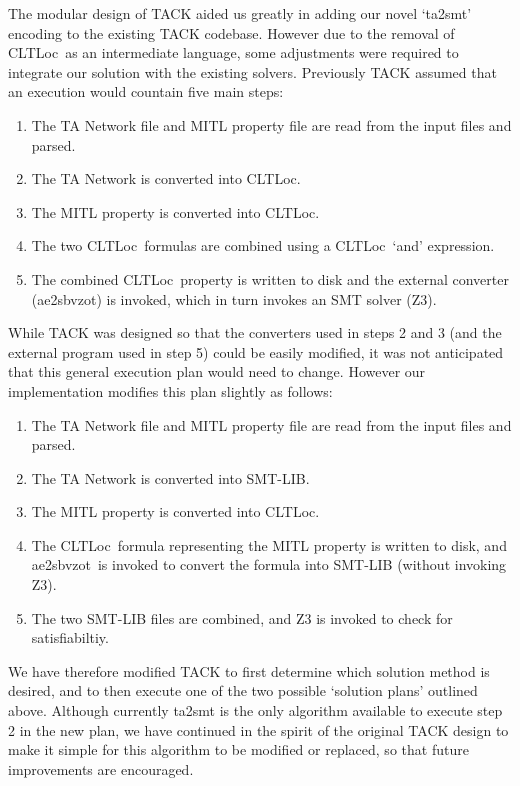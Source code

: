\documentclass[a4paper,11pt]{report}
\theoremstyle{definition}
\newcommand{\cltloc}{CLTLoc}
\newcommand{\aez}{ae2sbvzot}
\begin{document}
The modular design of TACK aided us greatly in adding our novel `ta2smt'
encoding to the existing TACK codebase. However due to the removal of \cltloc\
as an intermediate language, some adjustments were required to integrate our
solution with the existing solvers. Previously TACK assumed that an execution
would countain five main steps:
\begin{enumerate}
  \item The TA Network file and MITL property file are read from the input
  files and parsed.
  \item The TA Network is converted into \cltloc.
  \item The MITL property is converted into \cltloc.
  \item The two \cltloc\ formulas are combined using a \cltloc\ `and'
  expression.
  \item The combined \cltloc\ property is written to disk and the external
    converter (\aez) is invoked, which in turn invokes an SMT solver (Z3).
\end{enumerate}
While TACK was designed so that the converters used in steps 2 and 3 (and the
external program used in step 5) could be easily modified, it was not
anticipated that this general execution plan would need to change. However our
implementation modifies this plan slightly as follows:
\begin{enumerate}
  \item The TA Network file and MITL property file are read from the input
    files and parsed.
  \item The TA Network is converted into SMT-LIB.
  \item The MITL property is converted into \cltloc.
  \item The \cltloc\ formula representing the MITL property is written to disk,
    and \aez\ is invoked to convert the formula into SMT-LIB (without invoking
    Z3).
  \item The two SMT-LIB files are combined, and Z3 is invoked to check for
    satisfiabiltiy.
\end{enumerate}
We have therefore modified TACK to first determine which solution method is
desired, and to then execute one of the two possible `solution plans' outlined
above. Although currently ta2smt is the only algorithm available to execute step
2 in the new plan, we have continued in the spirit of the original TACK design
to make it simple for this algorithm to be modified or replaced, so that future
improvements are encouraged.
\end{document}
